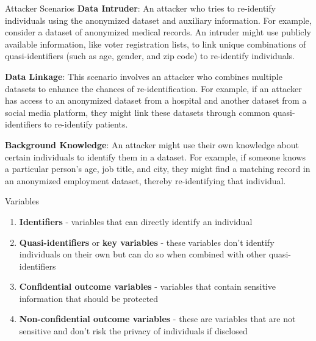 \documentclass[
	11pt, %
]{beamer}
\begin{document}
\begin{frame}{Attacker Scenarios}
\label{attacker-scenarios}
\textbf{Data Intruder}: An attacker who tries to re-identify individuals
using the anonymized dataset and auxiliary information. For example,
consider a dataset of anonymized medical records. An intruder might use
publicly available information, like voter registration lists, to link
unique combinations of quasi-identifiers (such as age, gender, and zip
code) to re-identify individuals.

\textbf{Data Linkage}: This scenario involves an attacker who combines
multiple datasets to enhance the chances of re-identification. For
example, if an attacker has access to an anonymized dataset from a
hospital and another dataset from a social media platform, they might
link these datasets through common quasi-identifiers to re-identify
patients.

\textbf{Background Knowledge}: An attacker might use their own knowledge
about certain individuals to identify them in a dataset. For example, if
someone knows a particular person's age, job title, and city, they might
find a matching record in an anonymized employment dataset, thereby
re-identifying that individual.
\end{frame}

\begin{frame}{Variables}
\label{variables}
\begin{enumerate}
\item
  \textbf{Identifiers} - variables that can directly identify an
  individual
\item
  \textbf{Quasi-identifiers} or \textbf{key variables} - these variables
  don't identify individuals on their own but can do so when combined
  with other quasi-identifiers
\item
  \textbf{Confidential outcome variables} - variables that contain
  sensitive information that should be protected
\item
  \textbf{Non-confidential outcome variables} - these are variables that
  are not sensitive and don't risk the privacy of individuals if
  disclosed
\end{enumerate}
\end{frame}
\end{document}

